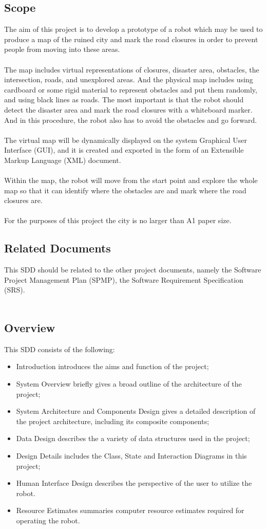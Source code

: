 \documentclass[11pt, a4paper,titlepage]{article}
\begin{document}
    \subsection{Scope}
    The aim of this project is to develop a prototype of a robot which may be used to produce a map of the ruined city and mark the road closures in order to prevent people from moving into these areas.\\
\\
The map includes virtual representations of closures, disaster area, obstacles, the intersection, roads, and unexplored areas. And the physical map includes using cardboard or some rigid material to represent obstacles and put them randomly, and using black lines as roads. The most important is that the robot should detect the disaster area and mark the road closures with a whiteboard marker. And in this procedure, the robot also has to avoid the obstacles and go forward.\\
\\
The virtual map will be dynamically displayed on the system Graphical User Interface (GUI), and it is created and exported in the form of an Extensible Markup Language (XML) document.\\
\\
Within the map, the robot will move from the start point and explore the whole map so that it can identify where the obstacles are and mark where the road closures are.\\
\\
For the purposes of this project the city is no larger than A1 paper size.
    \subsection{Related Documents}
    This SDD should be related to the other project documents, namely the Software Project Management Plan (SPMP), the Software Requirement Specification (SRS).\\
    \\
    \subsection{Overview}
    This SDD consists of the following:
    \begin{itemize}
    \item Introduction introduces the aims and function of the project;
    \item System Overview briefly gives a broad outline of the architecture of the project;
	\item System Architecture and Components Design gives a detailed description of the
 project architecture, including its composite components;
	\item Data Design describes the a variety of data structures used in the project;
	\item Design Details includes the Class, State and Interaction Diagrams in this project;
	\item Human Interface Design describes the perspective of the
 user to utilize the robot. 
 	\item  Resource Estimates summaries computer resource estimates required for operating
 the robot.
    \end{itemize}
\end{document}
